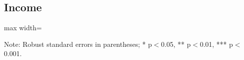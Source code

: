 \documentclass[11pt,harvard]{article}
\begin{document}
	\subsection{Income}
	
	\begin{table}[htbp]
		\centering
		\begin{adjustbox}{max width=\textwidth}
			\begin{threeparttable}
				\caption{Impact of Survey Modality on Income}
				\scriptsize
				 
				\label{tab:INC_Modality_CAR}
				\begin{tablenotes}
					\item Note: Robust standard errors in parentheses; * p$<$0.05, ** p$<$0.01, *** p$<$0.001. 
				\end{tablenotes}
			\end{threeparttable}
		\end{adjustbox}
	\end{table}
	\pagebreak
		
\end{document}
